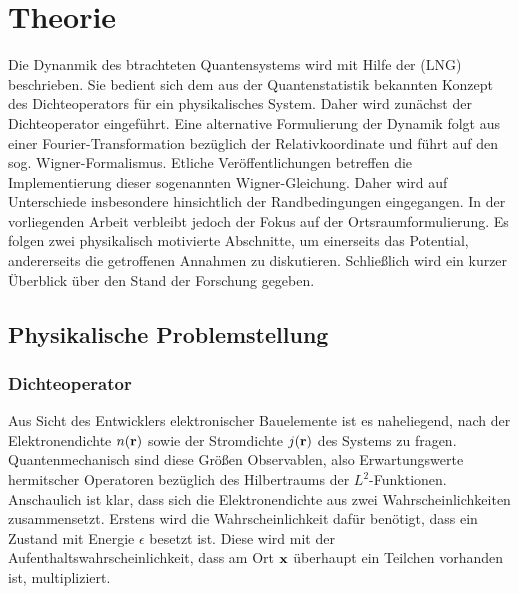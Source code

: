 \chapter{Theorie}

Die Dynanmik des btrachteten Quantensystems wird mit Hilfe der \lvn (LNG) beschrieben. Sie bedient sich dem aus der Quantenstatistik bekannten Konzept des Dichteoperators für ein physikalisches System. Daher wird zunächst der Dichteoperator  eingeführt. Eine alternative Formulierung der Dynamik folgt aus einer Fourier-Transformation bezüglich der Relativkoordinate und führt auf den sog. Wigner-Formalismus. Etliche Veröffentlichungen betreffen die Implementierung dieser sogenannten Wigner-Gleichung. Daher wird auf Unterschiede insbesondere hinsichtlich der Randbedingungen eingegangen. In der vorliegenden Arbeit verbleibt jedoch der Fokus auf der Ortsraumformulierung. Es folgen zwei physikalisch motivierte Abschnitte, um einerseits das Potential, andererseits die getroffenen Annahmen zu diskutieren. Schließlich wird ein kurzer Überblick über den Stand der Forschung gegeben.

\section{Physikalische Problemstellung}
\subsection{Dichteoperator} 
\label{sec:2_1}
Aus Sicht des Entwicklers elektronischer Bauelemente ist es naheliegend, nach der Elektronendichte $n(\vb{r})$ sowie der Stromdichte $j(\vb{r})$ des Systems zu fragen. Quantenmechanisch sind diese Größen Observablen, also Erwartungswerte hermitscher Operatoren bezüglich des Hilbertraums der $L^2$-Funktionen. Anschaulich ist klar, dass sich die Elektronendichte aus zwei Wahrscheinlichkeiten zusammensetzt. Erstens wird die Wahrscheinlichkeit dafür benötigt, dass ein Zustand mit Energie $\epsilon$ besetzt ist. Diese wird mit der Aufenthaltswahrscheinlichkeit, dass am Ort $\vb{x}$ überhaupt ein Teilchen vorhanden ist, multipliziert.

